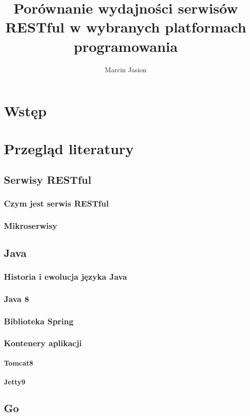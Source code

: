 \documentclass[a4paper,12pt,twoside,openany]{report}
\title{Porównanie wydajności serwisów RESTful w wybranych platformach programowania}
\author{Marcin Jasion}
\begin{document}
\maketitle

\chapter{Wstęp}

\chapter{Przegląd literatury}
\section{Serwisy RESTful}
\subsection{Czym jest serwis RESTful}
\subsection{Mikroserwisy}
\section{Java}
\subsection{Historia i ewolucja języka Java}
\subsection{Java 8}
\subsection{Biblioteka Spring}
\subsection{Kontenery aplikacji}
\subsubsection{Tomcat8}
\subsubsection{Jetty9}

\section{Go}
\end{document}
